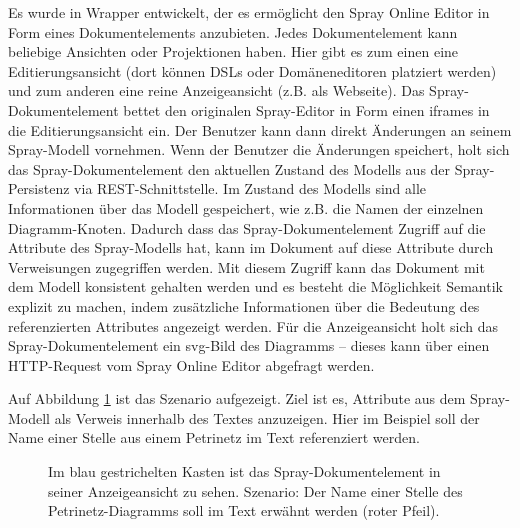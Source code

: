  
Es wurde in Wrapper entwickelt, der es ermöglicht den Spray Online Editor in Form eines Dokumentelements anzubieten. Jedes Dokumentelement kann beliebige Ansichten oder Projektionen haben. Hier gibt es zum einen eine Editierungsansicht (dort können DSLs oder Domäneneditoren platziert werden) und zum anderen eine reine Anzeigeansicht (z.B. als Webseite). Das Spray-Dokumentelement bettet den originalen Spray-Editor in Form einen iframes in die Editierungsansicht ein. Der Benutzer kann dann direkt Änderungen an seinem Spray-Modell vornehmen. Wenn der Benutzer die Änderungen speichert, holt sich das Spray-Dokumentelement den aktuellen Zustand des Modells aus der Spray-Persistenz via REST-Schnittstelle. Im Zustand des Modells sind alle Informationen über das Modell gespeichert, wie z.B. die Namen der einzelnen Diagramm-Knoten. Dadurch dass das Spray-Dokumentelement Zugriff auf die Attribute des Spray-Modells hat, kann im Dokument auf diese Attribute durch Verweisungen zugegriffen werden. Mit diesem Zugriff kann das Dokument mit dem Modell konsistent gehalten werden und es besteht die Möglichkeit Semantik explizit zu machen, indem zusätzliche Informationen über die Bedeutung des referenzierten Attributes angezeigt werden. Für die Anzeigeansicht holt sich das Spray-Dokumentelement ein svg-Bild des Diagramms -- dieses kann über einen HTTP-Request vom Spray Online Editor abgefragt werden.

 
Auf Abbildung \ref{sprayanzeigen} ist das Szenario aufgezeigt. Ziel ist es, Attribute aus dem Spray-Modell als Verweis innerhalb des Textes anzuzeigen. Hier im Beispiel soll der Name einer Stelle aus einem Petrinetz im Text referenziert werden.

 
\begin{figure}[h!]
\centering
\advance\leftskip-2.5cm
\caption{ Im blau gestrichelten Kasten ist das Spray-Dokumentelement in seiner Anzeigeansicht zu sehen. Szenario: Der Name einer Stelle des Petrinetz-Diagramms soll im Text erwähnt werden (roter Pfeil). }\label{sprayanzeigen}
\end{figure}
 
